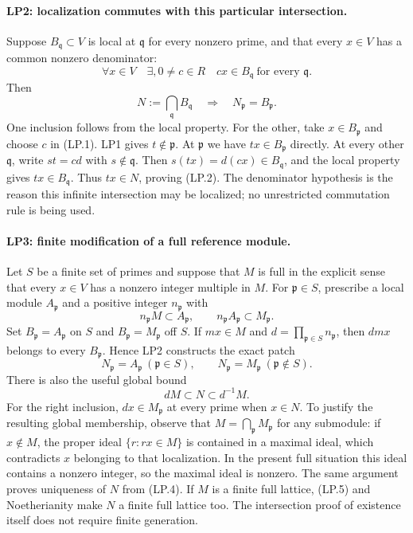 \paragraph{LP2: localization commutes with this particular intersection.}
Suppose $B_{\mathfrak q}\subset V$ is local at $\mathfrak q$ for
every nonzero prime, and that every $x\in V$ has a common nonzero
denominator:
\[
 \forall x\in V\quad\exists,0\ne c\in R\quad
                   cx\in B_{\mathfrak q}\ \text{for every }\mathfrak q.
                                                               \tag{LP.1}
\]
Then
\[
 N:=\bigcap_{\mathfrak q}B_{\mathfrak q}
       \quad\Longrightarrow\quad N_{\mathfrak p}=B_{\mathfrak p}.
                                                               \tag{LP.2}
\]
One inclusion follows from the local property. For the other, take
$x\in B_{\mathfrak p}$ and choose $c$ in (LP.1). LP1 gives
$t\notin\mathfrak p$. At $\mathfrak p$ we have
$tx\in B_{\mathfrak p}$ directly. At every other
$\mathfrak q$, write $st=cd$ with $s\notin\mathfrak q$.
Then $s(tx)=d(cx)\in B_{\mathfrak q}$, and the local property
gives $tx\in B_{\mathfrak q}$. Thus $tx\in N$, proving (LP.2).
The denominator hypothesis is the reason this infinite intersection
may be localized; no unrestricted commutation rule is being used.

\paragraph{LP3: finite modification of a full reference module.}
Let $S$ be a finite set of primes and suppose that $M$ is full in the
explicit sense that every $x\in V$ has a nonzero integer multiple in
$M$. For $\mathfrak p\in S$, prescribe a local module
$A_{\mathfrak p}$ and a positive integer $n_{\mathfrak p}$ with
\[
 n_{\mathfrak p}M\subset A_{\mathfrak p},\qquad
 n_{\mathfrak p}A_{\mathfrak p}\subset M_{\mathfrak p}.
                                                               \tag{LP.3}
\]
Set $B_{\mathfrak p}=A_{\mathfrak p}$ on $S$ and
$B_{\mathfrak p}=M_{\mathfrak p}$ off $S$. If $mx\in M$ and
$d=\prod_{\mathfrak p\in S}n_{\mathfrak p}$, then $dmx$ belongs
to every $B_{\mathfrak p}$. Hence LP2 constructs the exact patch
\[
 \boxed{\quad
 N_{\mathfrak p}=A_{\mathfrak p}\ (\mathfrak p\in S),\qquad
 N_{\mathfrak p}=M_{\mathfrak p}\ (\mathfrak p\notin S).
 \quad}                                                       \tag{LP.4}
\]
There is also the useful global bound
\[
                        dM\subset N\subset d^{-1}M.            \tag{LP.5}
\]
For the right inclusion, $dx\in M_{\mathfrak p}$ at every prime
when $x\in N$. To justify the resulting global membership, observe
that $M=\bigcap_{\mathfrak p}M_{\mathfrak p}$ for any submodule:
if $x\notin M$, the proper ideal $\{r:rx\in M\}$ is contained
in a maximal ideal, which contradicts $x$ belonging to that
localization. In the present full situation this ideal contains a
nonzero integer, so the maximal ideal is nonzero. The same argument
proves uniqueness of $N$ from (LP.4).
If $M$ is a finite full lattice, (LP.5) and Noetherianity make $N$
a finite full lattice too. The intersection proof of existence
itself does not require finite generation.

